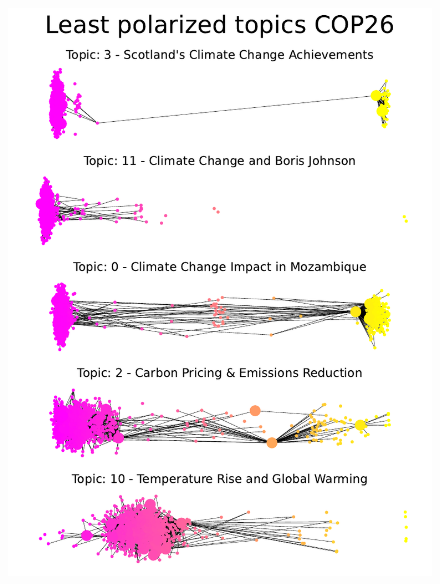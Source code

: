 \begin{figure}[H]
\begin{minipage}{0.50\textwidth}
    \end{minipage}
    \begin{minipage}{0.50\textwidth}
        \centering
         \includegraphics[width=0.98\linewidth]{Chapter5/figures/Least polarized topics COP26.pdf}
        

\end{minipage}
\end{figure}
